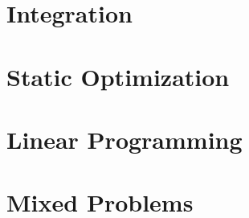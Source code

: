 \documentclass[10pt,oneside]{book}
\begin{document}
\part{Integration}









\part{Static Optimization}











\part{Linear Programming}









\part{Mixed Problems}





\backmatter


\end{document}
